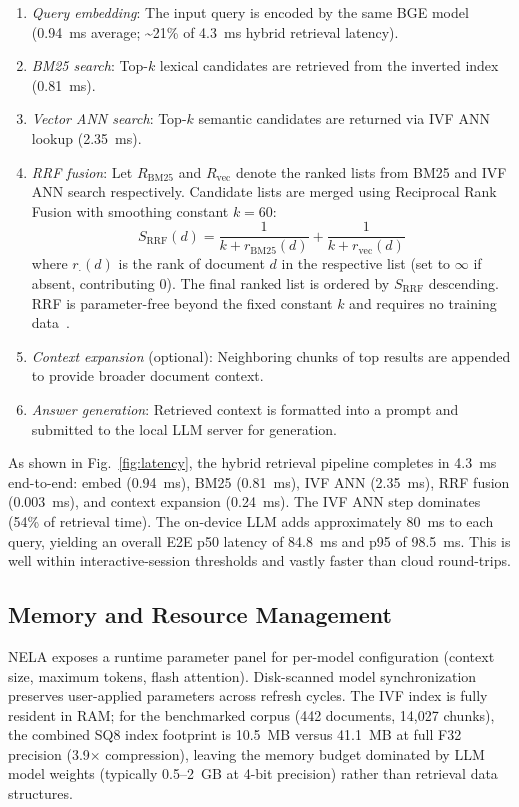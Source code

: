 \documentclass[conference]{IEEEtran}
\begin{document}
\begin{enumerate}
  \item \textit{Query embedding}: The input query is encoded by the same BGE
        model (0.94~ms average; \textasciitilde21\% of 4.3~ms hybrid retrieval latency).
  \item \textit{BM25 search}: Top-$k$ lexical candidates are retrieved from
        the inverted index (0.81~ms).
  \item \textit{Vector ANN search}: Top-$k$ semantic candidates are returned
        via IVF ANN lookup (2.35~ms).
  \item \textit{RRF fusion}: Let $R_{\text{BM25}}$ and $R_{\text{vec}}$ denote
        the ranked lists from BM25 and IVF ANN search respectively.
        Candidate lists are merged using Reciprocal Rank Fusion with smoothing
        constant $k{=}60$:
        \begin{equation}
          S_{\text{RRF}}(d) = \frac{1}{k + r_{\text{BM25}}(d)}
                            + \frac{1}{k + r_{\text{vec}}(d)}
          \label{eq:rrf}
        \end{equation}
        where $r_{\cdot}(d)$ is the rank of document $d$ in the respective
        list (set to $\infty$ if absent, contributing 0). The final ranked
        list is ordered by $S_{\text{RRF}}$ descending. RRF is parameter-free
        beyond the fixed constant $k$ and requires no training data~\cite{b5}.
  \item \textit{Context expansion} (optional): Neighboring chunks of top
        results are appended to provide broader document context.
  \item \textit{Answer generation}: Retrieved context is formatted into a
        prompt and submitted to the local LLM server for generation.
\end{enumerate}

As shown in Fig.~\ref{fig:latency}, the hybrid retrieval pipeline completes in
4.3~ms end-to-end: embed (0.94~ms), BM25 (0.81~ms), IVF ANN (2.35~ms), RRF
fusion (0.003~ms), and context expansion (0.24~ms). The IVF ANN step dominates
(54\% of retrieval time). The on-device LLM adds approximately 80~ms to each
query, yielding an overall E2E p50 latency of 84.8~ms and p95 of 98.5~ms.
This is well within interactive-session thresholds and vastly faster than
cloud round-trips.

\subsection{Memory and Resource Management}
NELA exposes a runtime parameter panel for per-model configuration
(context size, maximum tokens, flash attention). Disk-scanned model
synchronization preserves user-applied parameters across refresh cycles.
The IVF index is fully resident in RAM; for the benchmarked corpus (442
documents, 14{,}027 chunks), the combined SQ8 index footprint is 10.5~MB
versus 41.1~MB at full F32 precision (3.9$\times$ compression), leaving the
memory budget dominated by LLM model weights (typically 0.5--2~GB at 4-bit
precision) rather than retrieval data structures.
\end{document}
